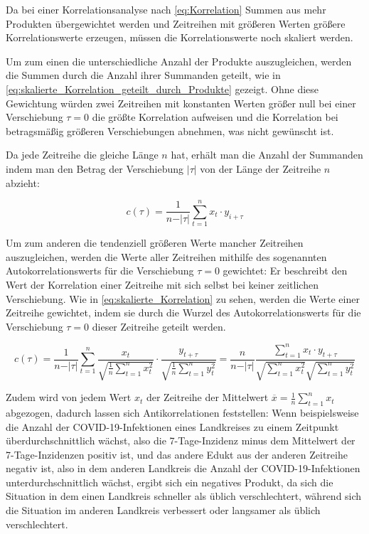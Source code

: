 Da bei einer Korrelationsanalyse nach \autoref{eq:Korrelation} Summen aus mehr Produkten übergewichtet werden und Zeitreihen mit größeren Werten größere Korrelationswerte erzeugen, müssen die Korrelationswerte noch skaliert werden.

Um zum einen die unterschiedliche Anzahl der Produkte auszugleichen, werden die Summen durch die Anzahl ihrer Summanden geteilt, wie in \autoref{eq:skalierte_Korrelation_geteilt_durch_Produkte} gezeigt. Ohne diese Gewichtung würden zwei Zeitreihen mit konstanten Werten größer null bei einer Verschiebung $\tau=0$ die größte Korrelation aufweisen und die Korrelation bei betragsmäßig größeren Verschiebungen abnehmen, was nicht gewünscht ist.

Da jede Zeitreihe die gleiche Länge $n$ hat, erhält man die Anzahl der Summanden indem man
den Betrag der Verschiebung $\vert\tau\vert$
von der Länge der Zeitreihe $n$ abzieht:

\begin{equation}\label{eq:skalierte_Korrelation_geteilt_durch_Produkte}
    c(\tau) =\frac{1}{n-\vert\tau\vert} \sum_{t=1}^n x_t\cdot y_{i+\tau}
\end{equation}

Um zum anderen die tendenziell größeren Werte mancher Zeitreihen auszugleichen, werden die Werte aller Zeitreihen mithilfe des sogenannten \glqq{}Autokorrelationswerts für die Verschiebung $\tau=0$ \grqq{} gewichtet: Er beschreibt den Wert der Korrelation einer Zeitreihe mit sich selbst bei keiner zeitlichen Verschiebung. Wie in \autoref{eq:skalierte_Korrelation} zu sehen, werden die Werte einer Zeitreihe gewichtet, indem sie durch die Wurzel des Autokorrelationswerts für die Verschiebung $\tau=0$ dieser Zeitreihe geteilt werden.

\begin{equation}\label{eq:skalierte_Korrelation}
    c(\tau) =
    \frac{1}{n-\vert\tau\vert}
    \sum_{t=1}^n
    \frac{x_t}{\sqrt{\frac{1}{n}\sum_{t=1}^n x_t^2}}
    \cdot
    \frac{y_{t+\tau}}{\sqrt{\frac{1}{n}\sum_{t=1}^n y_t^2}}
    =
    \frac{n}{n-\vert\tau\vert}
    \frac{\sum_{t=1}^n x_t \cdot y_{t+\tau}}
    {\sqrt{\sum_{t=1}^n x_t^2}
    \sqrt{\sum_{t=1}^n y_t^2}}
\end{equation}


Zudem wird von jedem Wert $x_t$ der Zeitreihe der Mittelwert $\overline x = \frac{1}{n}\sum_{t=1}^n x_t$ abgezogen, dadurch lassen sich Antikorrelationen feststellen: Wenn beispielsweise die Anzahl der COVID-19-Infektionen eines Landkreises zu einem Zeitpunkt überdurchschnittlich wächst, also die 7-Tage-Inzidenz minus dem Mittelwert der 7-Tage-Inzidenzen positiv ist, und das andere Edukt aus der anderen Zeitreihe negativ ist, also in dem anderen Landkreis die Anzahl der COVID-19-Infektionen unterdurchschnittlich wächst, ergibt sich ein negatives Produkt, da sich die Situation in dem einen Landkreis  schneller als üblich verschlechtert, während sich die Situation im anderen Landkreis verbessert oder langsamer als üblich verschlechtert.

